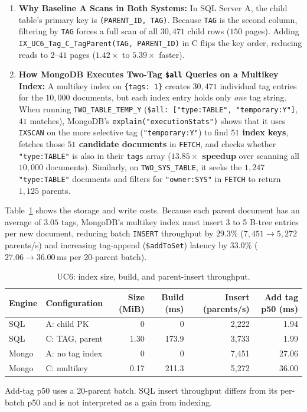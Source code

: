 \begin{enumerate}
\item \textbf{Why Baseline A Scans in Both Systems:} In SQL Server A, the child table's primary key is \texttt{(PARENT\_ID, TAG)}. Because \texttt{TAG} is the second column, filtering by \texttt{TAG} forces a full scan of all $30,471$ child rows ($150$ pages). Adding \texttt{IX\_UC6\_Tag\_C\_TagParent(TAG, PARENT\_ID)} in C flips the key order, reducing reads to $2$--$41$ pages ($1.42\times$ to $5.39\times$ faster).
\item \textbf{How MongoDB Executes Two-Tag \texttt{\$all} Queries on a Multikey Index:} A multikey index on \texttt{\{tags: 1\}} creates $30,471$ individual tag entries for the $10,000$ documents, but each index entry holds only \emph{one} tag string. When running \texttt{TWO\_TABLE\_TEMP\_Y} (\texttt{\$all: ["type:TABLE", "temporary:Y"]}, $41$ matches), MongoDB's \texttt{explain("executionStats")} shows that it uses \texttt{IXSCAN} on the more selective tag (\texttt{"temporary:Y"}) to find \textbf{$51$ index keys}, fetches those \textbf{$51$ candidate documents} in \texttt{FETCH}, and checks whether \texttt{"type:TABLE"} is also in their \texttt{tags} array (\textbf{$13.85\times$ speedup} over scanning all $10,000$ documents). Similarly, on \texttt{TWO\_SYS\_TABLE}, it seeks the $1,247$ \texttt{"type:TABLE"} documents and filters for \texttt{"owner:SYS"} in \texttt{FETCH} to return $1,125$ parents.
\end{enumerate}

Table~\ref{tab:uc6-tradeoff} shows the storage and write costs. Because each parent document has an average of $3.05$ tags, MongoDB's multikey index must insert 3 to 5 B-tree entries per new document, reducing batch \texttt{INSERT} throughput by \textbf{$29.3\%$} ($7,451 \rightarrow 5,272$\,parents/s) and increasing tag-append (\texttt{\$addToSet}) latency by \textbf{$33.0\%$} ($27.06 \rightarrow 36.00$\,ms per 20-parent batch).

\begin{table}[H]
\centering\small
\caption{UC6: index size, build, and parent-insert throughput.}
\label{tab:uc6-tradeoff}
\begin{tabular}{@{}l l r r r r@{}}
\toprule
Engine & Configuration & Size (MiB) & Build (ms) & Insert (parents/s) & Add tag p50 (ms)\\
\midrule
SQL & A: child PK & 0 & 0 & 2,222 & 1.94\\
SQL & C: TAG, parent & 1.30 & 173.9 & 3,733 & 1.99\\
Mongo & A: no tag index & 0 & 0 & 7,451 & 27.06\\
Mongo & C: multikey & 0.17 & 211.3 & 5,272 & 36.00\\
\bottomrule
\end{tabular}
\par\smallskip\scriptsize\raggedright Add-tag p50 uses a 20-parent batch. SQL insert throughput differs from its per-batch p50 and is not interpreted as a gain from indexing.\par
\end{table}

